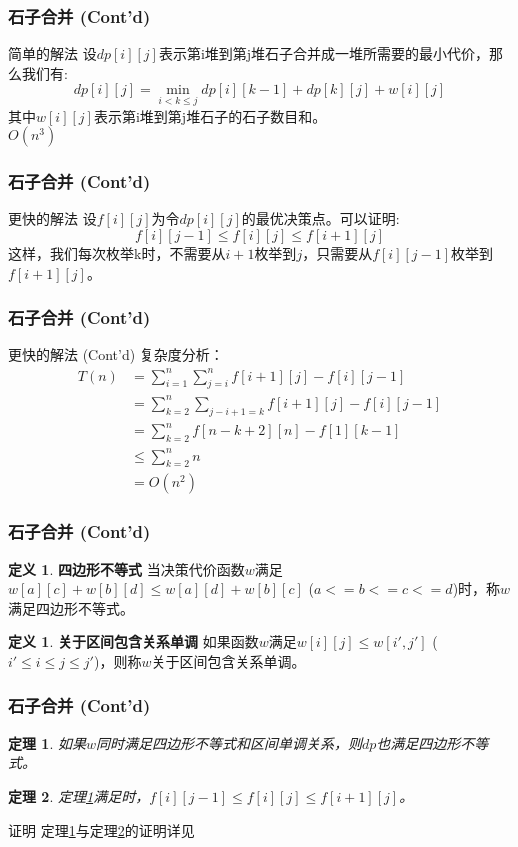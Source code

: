 \documentclass[hyperref={unicode=true}]{beamer}
\newtheorem{mytht}{\bf 定理}
\theoremstyle{definition}
\newtheorem{mydef}[]{\bf 定义}
\theoremstyle{proof}
\begin{document}
\begin{frame}\frametitle{石子合并 (Cont'd)}
  \begin{alertblock}{简单的解法}
    设$dp[i][j]$表示第i堆到第j堆石子合并成一堆所需要的最小代价，那么我们有:
    \[dp[i][j] = \min_{i < k \leq j}dp[i][k-1] + dp[k][j] + w[i][j]\]
    其中$w[i][j]$表示第i堆到第j堆石子的石子数目和。\\
    $O(n^3)$
  \end{alertblock}
\end{frame}
\begin{frame}\frametitle{石子合并 (Cont'd)}
  \begin{exampleblock}{更快的解法}
    设$f[i][j]$为令$dp[i][j]$的最优决策点。可以证明:
    \[f[i][j-1] \leq f[i][j] \leq f[i+1][j]\]
    这样，我们每次枚举k时，不需要从$i+1$枚举到$j$，只需要从$f[i][j-1]$枚举到$f[i+1][j]$。\\
  \end{exampleblock}
\end{frame}
\begin{frame}\frametitle{石子合并 (Cont'd)}
  \begin{exampleblock}{更快的解法 (Cont'd)}
    复杂度分析：
    \begin{align}
      T(n) &= \sum_{i=1}^{n}\sum_{j=i}^n f[i+1][j]-f[i][j-1]\\
      &= \sum_{k=2}^n\sum_{j-i+1=k} f[i+1][j] - f[i][j-1]\\
      &= \sum_{k=2}^n f[n-k+2][n]-f[1][k-1]\\
      &\leq \sum_{k=2}^n n\\
      &= O(n^2)
    \end{align}
  \end{exampleblock}
\end{frame}

\begin{frame}\frametitle{石子合并 (Cont'd)}
  \begin{mydef}{\bf 四边形不等式}
    当决策代价函数$w$满足$w[a][c]+w[b][d]\leq w[a][d]+w[b][c]$ ($a<=b<=c<=d$)时，称$w$满足四边形不等式。
  \end{mydef}
  \begin{mydef}{\bf 关于区间包含关系单调}
    如果函数$w$满足$w[i][j]\leq w[i',j']$ ($i' \leq i \leq j \leq j'$)，则称$w$关于区间包含关系单调。
  \end{mydef}
\end{frame}

\begin{frame}\frametitle{石子合并 (Cont'd)}
  \begin{mytht}{}\label{tht1}
    如果$w$同时满足四边形不等式和区间单调关系，则$dp$也满足四边形不等式。
  \end{mytht}
  \begin{mytht}{}\label{tht2}
    定理\ref{tht1}满足时，$f[i][j-1] \leq f[i][j] \leq f[i+1][j]$。
  \end{mytht}
  \begin{exampleblock}{证明}
    定理\ref{tht1}与定理\ref{tht2}的证明详见\cite{art3}
  \end{exampleblock}
\end{frame}
\end{document}
